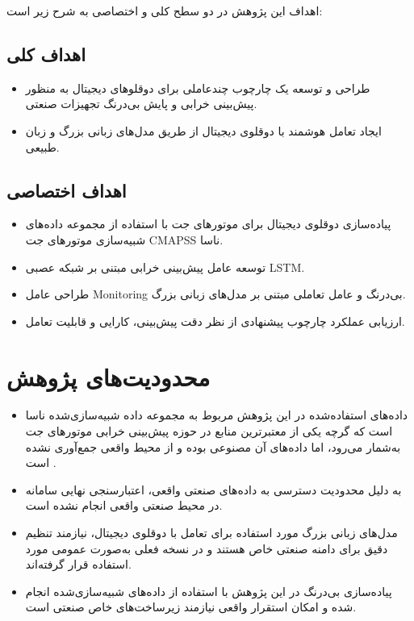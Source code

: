 \documentclass[a4paper,fleqn]{report}
\begin{document}
اهداف این پژوهش در دو سطح کلی و اختصاصی به شرح زیر است:

\subsection*{اهداف کلی}
\begin{itemize}
	\item طراحی و توسعه یک چارچوب چندعاملی برای دوقلوهای دیجیتال به منظور پیش‌بینی خرابی و پایش بی‌درنگ تجهیزات صنعتی.
	\item ایجاد تعامل هوشمند با دوقلوی دیجیتال از طریق مدل‌های زبانی بزرگ و زبان طبیعی.
\end{itemize}

\subsection*{اهداف اختصاصی}
\begin{itemize}
	\item پیاده‌سازی دوقلوی دیجیتال برای موتورهای جت با استفاده از مجموعه داده‌های شبیه‌سازی موتورهای جت  \gls{CMAPSS} ناسا.
	\item توسعه عامل پیش‌بینی خرابی مبتنی بر شبکه عصبی \gls{LSTM}.
	\item طراحی عامل \gls{Monitoring} بی‌درنگ و عامل تعاملی مبتنی بر مدل‌های زبانی بزرگ.
	\item ارزیابی عملکرد چارچوب پیشنهادی از نظر دقت پیش‌بینی، کارایی و قابلیت تعامل.
\end{itemize}



\section{محدودیت‌های پژوهش}

\begin{itemize}
	\item
	 داده‌های استفاده‌شده در این پژوهش مربوط به مجموعه داده شبیه‌سازی‌شده  ناسا است که گرچه یکی از معتبرترین منابع در حوزه پیش‌بینی خرابی موتورهای جت به‌شمار می‌رود، اما داده‌های آن مصنوعی بوده و از محیط واقعی جمع‌آوری نشده است \cite{NASA2007C-MAPSS}.
	\item
	 به دلیل محدودیت دسترسی به داده‌های صنعتی واقعی، اعتبارسنجی نهایی سامانه در محیط صنعتی واقعی انجام نشده است.
	\item
	 مدل‌های زبانی بزرگ مورد استفاده برای تعامل با دوقلوی دیجیتال، نیازمند تنظیم دقیق برای دامنه صنعتی خاص هستند و در نسخه فعلی به‌صورت عمومی مورد استفاده قرار گرفته‌اند.
	\item
	 پیاده‌سازی بی‌درنگ در این پژوهش با استفاده از داده‌های شبیه‌سازی‌شده انجام شده و امکان استقرار واقعی نیازمند زیرساخت‌های خاص صنعتی است.
\end{itemize}
\end{document}
